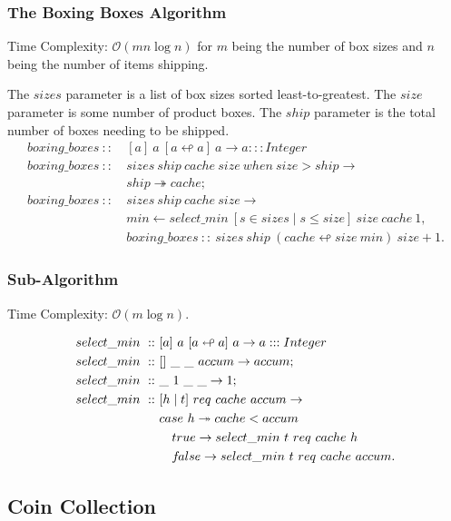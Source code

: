 \documentclass[a4paper,10pt]{book}
\newcommand\when{\  when\ }
\newcommand{\false}{f\kern-0.25ex{alse}}
\begin{document}
\subsubsection{The Boxing Boxes Algorithm}

Time Complexity: $\mathcal{O}(mn\log n)$ for $m$ being the number of box sizes and $n$ being the number of items shipping.

The $sizes$ parameter is a list of box sizes sorted least-to-greatest. The $size$ parameter is some number of product boxes. The $ship$ parameter is the total number of boxes needing to be shipped.
\begin{align*}
boxing\_boxes\ ::\ &[a]\ a\ [a\looparrowleft a]\ a\rightarrow a:::Integer\\
boxing\_boxes\ ::\ &sizes\ ship\ cache\ size\when size > ship\rightarrow\\
	&ship\twoheadrightarrow cache;\\
boxing\_boxes\ ::\ &sizes\ ship\ cache\ size\rightarrow\\
	&min\leftarrow select\_min\ [s\in sizes\mid s\le size]\ size\ cache\ 1,\\
	&boxing\_boxes\ ::\ sizes\ ship\ (cache\looparrowleft size\ min)\ size+1.
\end{align*}

\subsubsection{Sub-Algorithm}

Time Complexity: $\mathcal{O}(m\log n)$.

\begin{align*}
select\_min\ ::\ &[a]\ a\ [a\looparrowleft a]\ a\rightarrow a:::Integer\\
select\_min\ ::\ &[]\ \_\ \_\ accum\rightarrow accum;\\
select\_min\ ::\ &\_\ 1\ \_\ \_\rightarrow 1;\\
select\_min\ ::\ &[h\mid t]\ req\ cache\ accum\rightarrow\\
	&case\ h\twoheadrightarrow cache < accum\\
	&\quad true\rightarrow select\_min\ t\ req\ cache\ h\\
	&\quad\false\rightarrow select\_min\ t\ req\ cache\ accum.
\end{align*}

\subsection{Coin Collection}
\end{document}
